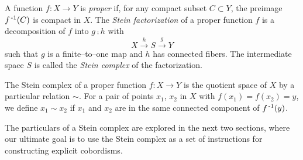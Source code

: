 \begin{defn}
	\label{def:stein}
	A function $f:X\to Y$ is \emph{proper} if, for any compact subset $C\subset Y$, the preimage $f^{\,\text{-}1}(C)$ is compact in $X$.
	The \emph{Stein factorization} of a proper function $f$ is a decomposition of $f$ into $g\comp h$ with $$X\overset{h}{\to} S \overset{g}{\to} Y$$ such that $g$ is a finite--to--one map and $h$ has connected fibers.
	The intermediate space $S$ is called the \emph{Stein complex} of the factorization.
\end{defn}

The Stein complex of a proper function $f:X\to Y$ is the quotient space of $X$ by a particular relation $\sim$.
For a pair of points $x_1$, $x_2$ in $X$ with $f(x_1)=f(x_2)=y$, we define $x_1\sim x_2$ if $x_1$ and $x_2$ are in the same connected component of $f^{\,\text{-}1}(y)$.

The particulars of a Stein complex are explored in the next two sections, where our ultimate goal is to use the Stein complex as a set of instructions for constructing explicit cobordisms.
